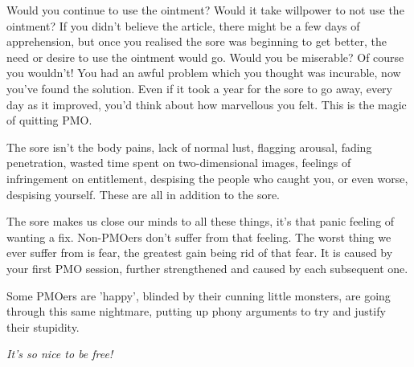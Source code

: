 \documentclass[easypeasy.tex]{subfiles}
\begin{document}
Would you continue to use the ointment? Would it take willpower to not use the ointment? If you didn't believe the article, there might be a few days of apprehension, but once you realised the sore was beginning to get better, the need or desire to use the ointment would go. Would you be miserable? Of course you wouldn't! You had an awful problem which you thought was incurable, now you've found the solution. Even if it took a year for the sore to go away, every day as it improved, you'd think about how marvellous you felt. This is the magic of quitting PMO.

The sore isn't the body pains, lack of normal lust, flagging arousal, fading penetration, wasted time spent on two-dimensional images, feelings of infringement on entitlement, despising the people who caught you, or even worse, despising yourself. These are all in addition to the sore.

The sore makes us close our minds to all these things, it's that panic feeling of wanting a fix. Non-PMOers don't suffer from that feeling. The worst thing we ever suffer from is fear, the greatest gain being rid of that fear. It is caused by your first PMO session, further strengthened and caused by each subsequent one.

Some PMOers are 'happy', blinded by their cunning little monsters, are going through this same nightmare, putting up phony arguments to try and justify their stupidity.

\textit{It's so nice to be free!}
\end{document}

